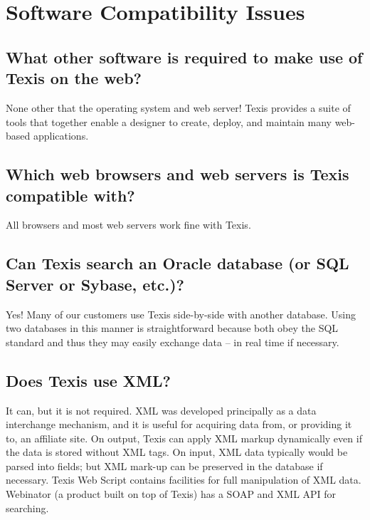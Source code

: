 \chapter{Software Compatibility Issues}

\section{What other software is required to make use of Texis on the web? }

None other that the operating system and web server! Texis provides a
suite of tools that together enable a designer to create, deploy, and
maintain many web-based applications.

\section{Which web browsers and web servers is Texis compatible with? }

All browsers and most web servers work fine with Texis.

\section{Can Texis search an Oracle database (or SQL Server or Sybase, etc.)? }

Yes! Many of our customers use Texis side-by-side with another
database. Using two databases in this manner is straightforward
because both obey the SQL standard and thus they may easily exchange
data -- in real time if necessary.

\section{Does Texis use XML? }

It can, but it is not required. XML was developed principally as a
data interchange mechanism, and it is useful for acquiring data from,
or providing it to, an affiliate site. On output, Texis can apply XML
markup dynamically even if the data is stored without XML tags.  On
input, XML data typically would be parsed into fields; but XML mark-up
can be preserved in the database if necessary.  Texis Web Script
contains facilities for full manipulation of XML data.  Webinator (a
product built on top of Texis) has a SOAP and XML API for searching.

